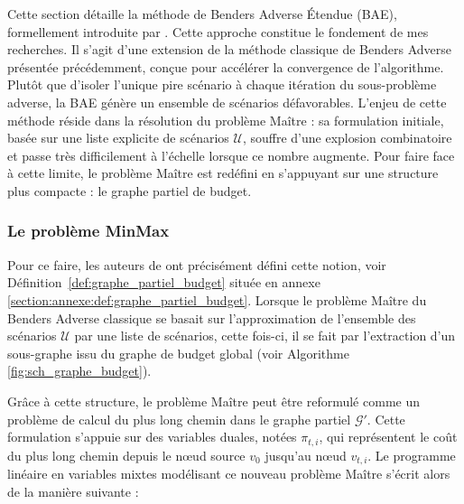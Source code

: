 \documentclass[12pt, a4paper, twoside]{article}
\numberwithin{equation}{section}
\newcommand{\mmx}{\textbf{MinMax} }
\begin{document}
	Cette section détaille la méthode de  Benders Adverse Étendue (BAE), formellement introduite par \cite{portoleauTHESIS}. Cette approche constitue le fondement de mes recherches. Il s'agit d'une extension de la méthode classique de Benders Adverse présentée précédemment, conçue pour accélérer la convergence de l'algorithme. Plutôt que d'isoler l'unique pire scénario à chaque itération du sous-problème adverse, la BAE génère un ensemble de scénarios défavorables. L'enjeu de cette méthode réside dans la résolution du problème Maître : sa formulation initiale, basée sur une liste explicite de scénarios  $\mathcal{U}$, souffre d'une explosion combinatoire et passe très difficilement à l'échelle lorsque ce nombre augmente. Pour faire face à cette limite, le problème Maître est redéfini en s'appuyant sur une structure plus compacte : le graphe partiel de budget.
	
	\subsubsection{Le problème \mmx}
	
	Pour ce faire, les auteurs de \cite{portoleauTHESIS} ont précisément défini cette notion, voir Définition~\ref{def:graphe_partiel_budget} située en annexe \ref{section:annexe:def:graphe_partiel_budget}. Lorsque le problème Maître du Benders Adverse classique se basait sur l'approximation de l'ensemble des scénarios $\mathcal{U}$ par une liste de scénarios, cette fois-ci, il se fait par l'extraction d'un sous-graphe issu du graphe de budget global (voir Algorithme \ref{fig:sch_graphe_budget}).
	
	Grâce à cette structure, le problème Maître peut être reformulé comme un problème de calcul du plus long chemin dans le graphe partiel $\mathcal{G}'$. Cette formulation s'appuie sur des variables duales, notées $\pi_{t,i}$, qui représentent le coût du plus long chemin depuis le nœud source $v_0$ jusqu'au nœud $v_{t,i}$. Le programme linéaire en variables mixtes modélisant ce nouveau problème Maître s'écrit alors de la manière suivante :
\end{document}

